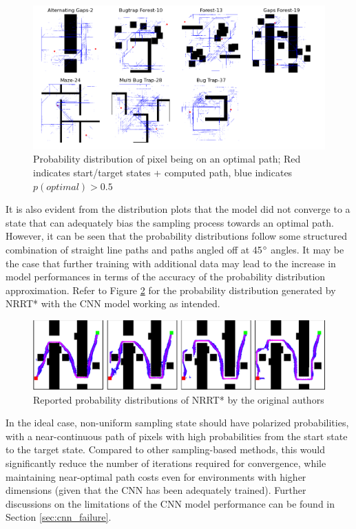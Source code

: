 \documentclass{article}
\begin{document}
\begin{figure}
\centering
\includegraphics[scale=0.6]{all_prob}
\caption{Probability distribution of pixel being on an optimal path; Red indicates start/target states + computed path, blue indicates $p(optimal) > 0.5$}
\label{fig:all_prob}
\end{figure}

It is also evident from the distribution plots that the model did not converge to a state that can adequately bias the sampling process towards an optimal path. However, it can be seen that the probability distributions follow some structured combination of straight line paths and paths angled off at 45$\degree$ angles. It may be the case that further training with additional data may lead to the increase in model performances in terms of the accuracy of the probability distribution approximation. Refer to Figure \ref{fig:nrrt_ideal} for the probability distribution generated by NRRT* with the CNN model working as intended.

\begin{figure}
\centering
\includegraphics[scale=0.5]{nrrt_ideal}
\caption{Reported probability distributions of NRRT* by the original authors \cite{nrrt}}
\label{fig:nrrt_ideal}
\end{figure}

In the ideal case, non-uniform sampling state should have polarized probabilities, with a near-continuous path of pixels with high probabilities from the start state to the target state. Compared to other sampling-based methods, this would significantly reduce the number of iterations required for convergence, while maintaining near-optimal path costs even for environments with higher dimensions (given that the CNN has been adequately trained). Further discussions on the limitations of the CNN model performance can be found in Section \ref{sec:cnn_failure}.
\end{document}
